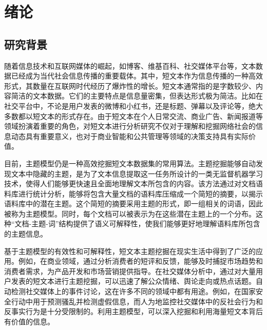 \chapter{绪论}\label{chap:intro}
\section{研究背景}\label{sec:background}
随着信息技术和互联网媒体的崛起，如博客、维基百科、社交媒体平台等，文本数据已经成为当代社会信息传播的重要载体。其中，短文本作为信息传播的一种高效形式，其数量在互联网时代经历了爆炸性的增长。短文本通常指的是字数较少、内容简洁的文本数据。它们的主要特点是信息量密集，但表达形式极为简洁。比如在社交平台中，不论是用户发表的微博和小红书，还是标题、弹幕以及评论等，绝大多数都以短文本的形式存在。由于短文本在个人日常交流、商业广告、新闻报道等领域扮演着重要的角色，对短文本进行分析研究不仅对于理解和挖掘网络社会的信息动态具有重要意义，也对于商业智能和公共管理等领域的决策支持具有实际价值。

目前，主题模型仍是一种高效挖掘短文本数据集的常用算法。主题挖掘能够自动发现文本中隐藏的主题，是为了文本信息提取这一任务所设计的一类无监督机器学习技术，使得人们能够更快速且全面地理解文本所包含的内容。该方法通过对文档语料库进行统计分析，能够将包含大量文档的语料库压缩成一个简短的摘要，以揭示语料库中的潜在主题。这个简短的摘要采用主题的形式，即一组相关的词语，因此被称为主题模型。同时，每个文档可以被表示为在这些潜在主题上的一个分布。这种“文档-主题-词”结构提供了语义可解释性，使我们能够更好地理解语料库所包含的主题信息。

基于主题模型的有效性和可解释性，短文本主题挖掘在现实生活中得到了广泛的应用。例如，在商业领域，通过分析消费者的短评和反馈，能够及时捕捉市场趋势和消费者需求，为产品开发和市场营销提供指导。在社交媒体分析中，通过对大量用户发表的短文本进行主题挖掘，可以迅速了解公众情绪、舆论走向或热点话题。自动检测社交媒体上的事件讨论，这在许多不同的领域中都有用途。例如，在国家安全行动中用于预测骚乱并检测虚假信息\cite{DisruptiveEventDetection}，而人为地监控社交媒体中的反社会行为和反事实行为是十分受限制的。利用主题模型，可以深入挖掘和利用海量短文本背后有价值的信息。
    
